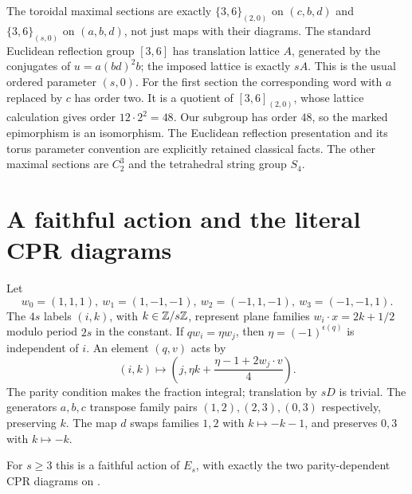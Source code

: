 The toroidal maximal sections are exactly $\{3,6\}_{(2,0)}$ on $(c,b,d)$
and $\{3,6\}_{(s,0)}$ on $(a,b,d)$, not just maps with their diagrams.
The standard Euclidean reflection group $[3,6]$ has translation lattice
$A$, generated by the conjugates of $u=a(bd)^2b$; the imposed lattice is
exactly $sA$. This is the usual ordered parameter $(s,0)$.
For the first section the corresponding word with $a$ replaced by $c$
has order two. It is a quotient of $[3,6]_{(2,0)}$, whose lattice
calculation gives order $12\cdot2^2=48$. Our subgroup has order $48$,
so the marked epimorphism is an isomorphism. The Euclidean reflection
presentation and its torus parameter convention are explicitly retained
classical facts. The other maximal sections are $C_2^3$ and the
tetrahedral string group $S_4$.

\section{A faithful action and the literal CPR diagrams}
Let
\[
w_0=(1,1,1),\ w_1=(1,-1,-1),\ w_2=(-1,1,-1),\ w_3=(-1,-1,1).
\]
The $4s$ labels $(i,k)$, with $k\in\mathbb Z/s\mathbb Z$, represent plane families
$w_i\cdot x=2k+1/2$ modulo period $2s$ in the constant. If
$qw_i=\eta w_j$, then $\eta=(-1)^{\epsilon(q)}$ is independent of $i$.
An element $(q,v)$ acts by
\begin{equation}\label{eq:action}
(i,k)\longmapsto\left(j,\eta k+\frac{\eta-1+2w_j\cdot v}{4}\right).
\end{equation}
The parity condition makes the fraction integral; translation by $sD$
is trivial. The generators $a,b,c$ transpose family pairs $(1,2),(2,3),(0,3)$ respectively, preserving $k$. The map $d$ swaps families $1,2$
with $k\mapsto-k-1$, and preserves $0,3$ with $k\mapsto-k$.
\begin{lemma}\label{lem:faithful}
For $s\ge3$ this is a faithful action of $E_s$, with exactly the two
parity-dependent CPR diagrams on \cite[p.~6]{source}.
\end{lemma}

